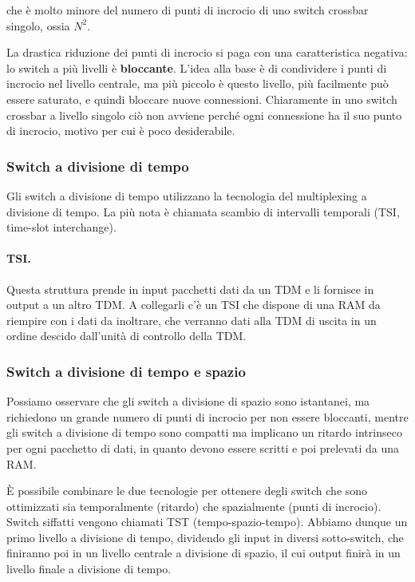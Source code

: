             che è molto minore del numero di punti di incrocio di uno switch crossbar singolo, ossia $N^2$.
            
            La drastica riduzione dei punti di incrocio si paga con una caratteristica negativa: lo switch a più livelli è \textbf{bloccante}. L'idea alla base è di condividere i punti di incrocio nel livello centrale, ma più piccolo è questo livello, più facilmente può essere saturato, e quindi bloccare nuove connessioni. Chiaramente in uno switch crossbar a livello singolo ciò non avviene perché ogni connessione ha il suo punto di incrocio, motivo per cui è poco desiderabile.
            
        \subsubsection{Switch a divisione di tempo}
            Gli switch a divisione di tempo utilizzano la tecnologia del multiplexing a divisione di tempo. La più nota è chiamata scambio di intervalli temporali (TSI, time-slot interchange).
            
            \paragraph{TSI.} Questa struttura prende in input pacchetti dati da un TDM e li fornisce in output a un altro TDM. A collegarli c'è un TSI che dispone di una RAM da riempire con i dati da inoltrare, che verranno dati alla TDM di uscita in un ordine descido dall'unità di controllo della TDM.
            
        \subsubsection{Switch a divisione di tempo e spazio}
            Possiamo osservare che gli switch a divisione di spazio sono istantanei, ma richiedono un grande numero di punti di incrocio per non essere bloccanti, mentre gli switch a divisione di tempo sono compatti ma implicano un ritardo intrinseco per ogni pacchetto di dati, in quanto devono essere scritti e poi prelevati da una RAM.
            
            È possibile combinare le due tecnologie per ottenere degli switch che sono ottimizzati sia temporalmente (ritardo) che spazialmente (punti di incrocio). Switch siffatti vengono chiamati TST (tempo-spazio-tempo). Abbiamo dunque un primo livello a divisione di tempo, dividendo gli input in diversi sotto-switch, che finiranno poi in un livello centrale a divisione di spazio, il cui output finirà in un livello finale a divisione di tempo.
            
